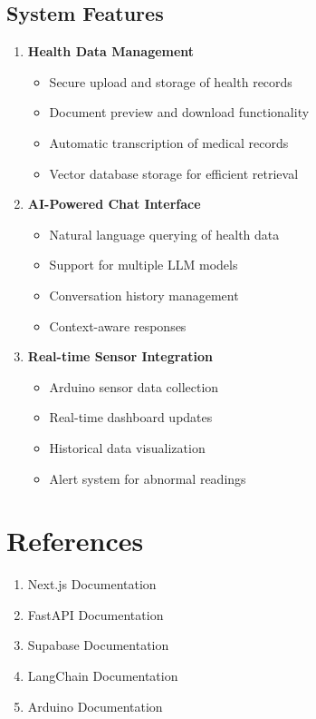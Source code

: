 \subsection{System Features}
\begin{enumerate}
    \item \textbf{Health Data Management}
    \begin{itemize}
        \item Secure upload and storage of health records
        \item Document preview and download functionality
        \item Automatic transcription of medical records
        \item Vector database storage for efficient retrieval
    \end{itemize}

    \item \textbf{AI-Powered Chat Interface}
    \begin{itemize}
        \item Natural language querying of health data
        \item Support for multiple LLM models
        \item Conversation history management
        \item Context-aware responses
    \end{itemize}

    \item \textbf{Real-time Sensor Integration}
    \begin{itemize}
        \item Arduino sensor data collection
        \item Real-time dashboard updates
        \item Historical data visualization
        \item Alert system for abnormal readings
    \end{itemize}
\end{enumerate}

\section{References}
\begin{enumerate}
    \item Next.js Documentation
    \item FastAPI Documentation
    \item Supabase Documentation
    \item LangChain Documentation
    \item Arduino Documentation
\end{enumerate} 